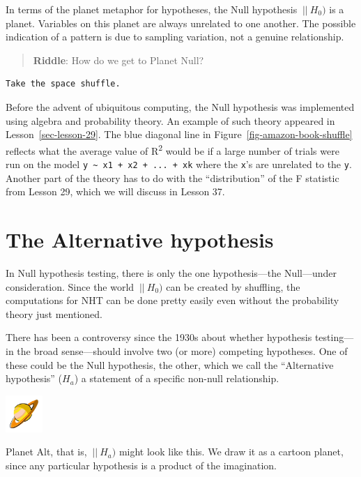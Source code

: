 \documentclass[
  letterpaper,
  DIV=11,
  numbers=noendperiod,
  oneside]{scrreprt}
\begin{document}
In terms of the planet metaphor for hypotheses, the Null hypothesis
\({\ |\!\!|\  } H_0)\) is a planet. Variables on this planet are always
unrelated to one another. The possible indication of a pattern is due to
sampling variation, not a genuine relationship.

\begin{quote}
\textbf{Riddle}: How do we get to Planet Null?
\end{quote}

\begin{verbatim}
Take the space shuffle.
\end{verbatim}

Before the advent of ubiquitous computing, the Null hypothesis was
implemented using algebra and probability theory. An example of such
theory appeared in Lesson~\ref{sec-lesson-29}. The blue diagonal line in
Figure~\ref{fig-amazon-book-shuffle} reflects what the average value of
R\textsuperscript{2} would be if a large number of trials were run on
the model \texttt{y\ \textasciitilde{}\ x1\ +\ x2\ +\ ...\ +\ xk} where
the \texttt{x}'s are unrelated to the \texttt{y}. Another part of the
theory has to do with the ``distribution'' of the F statistic from
Lesson 29, which we will discuss in Lesson 37.

\hypertarget{the-alternative-hypothesis}{%
\section{The Alternative hypothesis}\label{the-alternative-hypothesis}}

In Null hypothesis testing, there is only the one hypothesis---the
Null---under consideration. Since the world \({\ |\!\!|\  } H_0)\) can
be created by shuffling, the computations for NHT can be done pretty
easily even without the probability theory just mentioned.

There has been a controversy since the 1930s about whether hypothesis
testing---in the broad sense---should involve two (or more) competing
hypotheses. One of these could be the Null hypothesis, the other, which
we call the ``Alternative hypothesis'' (\(H_a\)) a statement of a
specific non-null relationship.

\begin{marginfigure}

{\centering \includegraphics[width=0.55in,height=\textheight]{./www/planet-alt.png}

}

\caption{\label{fig-planet-alt}Planet Alt, that is, \(\ |\!\!|\  H_a)\)
might look like this. We draw it as a cartoon planet, since any
particular hypothesis is a product of the imagination.}

\end{marginfigure}
\end{document}
